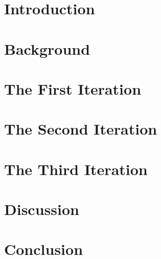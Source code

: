 \documentclass[a4paper, 12pt, openany]{book} %
\numberwithin{example}{section}
\begin{document}

\cleardoublepage
{}
\setcounter{page}{1}

\chapter{Introduction}

\cleardoublepage

\chapter{Background}

\cleardoublepage

% 

\chapter{The First Iteration}

\cleardoublepage
\chapter{The Second Iteration}

\cleardoublepage
\chapter{The Third Iteration}

\cleardoublepage

% 

\chapter{Discussion}

\cleardoublepage

\chapter{Conclusion}

\cleardoublepage
\end{document}
